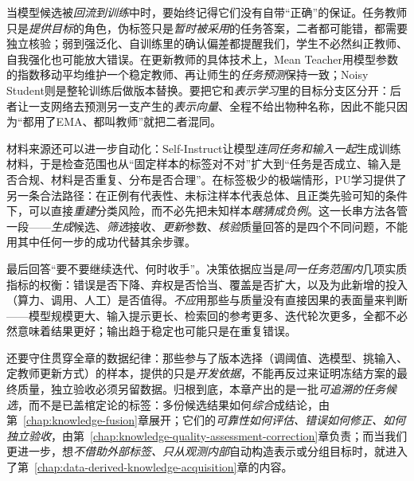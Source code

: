 当模型候选被\emph{回流到训练}中时，要始终记得它们没有自带“正确”的保证。任务教师只是\emph{提供目标}的角色，伪标签只是\emph{暂时被采用}的任务答案，二者都可能错，都需要独立核验；弱到强泛化、自训练里的确认偏差都提醒我们，学生不必然纠正教师、自我强化也可能放大错误。在更新教师的具体技术上，Mean Teacher用模型参数的指数移动平均维护一个稳定教师、再让师生的\emph{任务预测}保持一致；Noisy Student则是整轮训练后做版本替换。要把它和\emph{表示学习}里的目标分支区分开：后者让一支网络去预测另一支产生的\emph{表示向量}、全程不给出物种名称，因此不能只因为“都用了EMA、都叫教师”就把二者混同。

材料来源还可以进一步自动化：Self-Instruct让模型\emph{连同任务和输入一起}生成训练材料，于是检查范围也从“固定样本的标签对不对”扩大到“任务是否成立、输入是否合规、材料是否重复、分布是否合理”。在标签极少的极端情形，PU学习提供了另一条合法路径：在正例有代表性、未标注样本代表总体、且正类先验可知的条件下，可以直接\emph{重建}分类风险，而不必先把未知样本\emph{瞎猜成负例}。这一长串方法各管一段——\emph{生成}候选、\emph{筛选}接收、\emph{更新}参数、\emph{核验}质量回答的是四个不同问题，不能用其中任何一步的成功代替其余步骤。

最后回答“要不要继续迭代、何时收手”。决策依据应当是\emph{同一任务范围内}几项实质指标的权衡：错误是否下降、弃权是否恰当、覆盖是否扩大，以及为此新增的投入（算力、调用、人工）是否值得。\emph{不应}用那些与质量没有直接因果的表面量来判断——模型规模更大、输入提示更长、检索回的参考更多、迭代轮次更多，全都不必然意味着结果更好；输出趋于稳定也可能只是在重复错误。

还要守住贯穿全章的数据纪律：那些参与了版本选择（调阈值、选模型、挑输入、定教师更新方式）的样本，提供的只是\emph{开发依据}，不能再反过来证明冻结方案的最终质量，独立验收必须另留数据。归根到底，本章产出的是一批\emph{可追溯的任务候选}，而不是已盖棺定论的标签：多份候选结果如何\emph{综合}成结论，由第~\ref{chap:knowledge-fusion}章展开；它们的\emph{可靠性如何评估、错误如何修正、如何独立验收}，由第~\ref{chap:knowledge-quality-assessment-correction}章负责；而当我们更进一步，想\emph{不借助外部标签、只从观测内部}自动构造表示或分组目标时，就进入了第~\ref{chap:data-derived-knowledge-acquisition}章的内容。
